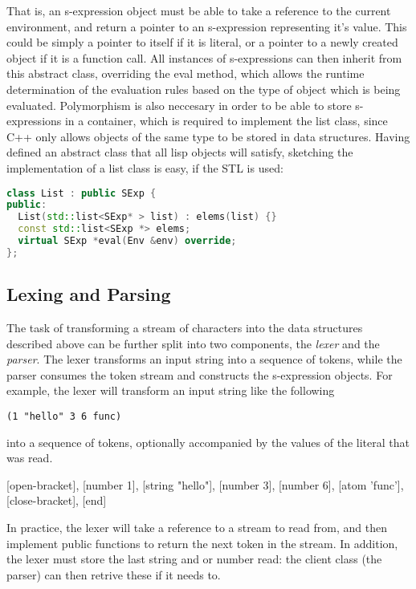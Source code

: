 \documentclass[12pt]{article}
\begin{document}
That is, an s-expression object must be able to take a reference to the current environment, and return a pointer to an s-expression representing it's value. This could be 
simply a pointer to itself if it is literal, or a pointer to a newly created object if it is a function call. All instances of s-expressions can then inherit from this abstract class, 
overriding the eval method, which allows the runtime determination of the evaluation rules based on the type of object which is being evaluated. Polymorphism is also 
neccesary in order to be able to store s-expressions in a container, which is required to implement the list class, since C++ only allows objects of the same type to be stored in data structures. Having defined an abstract class that all lisp objects will satisfy, sketching the implementation of a list class is easy, if the STL is used:
\begin{lstlisting}[language=C++]
class List : public SExp {
public:
  List(std::list<SExp* > list) : elems(list) {}
  const std::list<SExp *> elems;
  virtual SExp *eval(Env &env) override;
};
\end{lstlisting}


\subsection{Lexing and Parsing}
\label{section:parser}

The task of transforming a stream of characters into the data structures described above can be further split into two components, the \textit{lexer} and the \textit{parser}.
The lexer transforms an input string into a sequence of tokens, while the parser consumes the token stream and constructs the s-expression objects. For example, the 
lexer will transform an input string like the following
\begin{lstlisting}
(1 "hello" 3 6 func) 
\end{lstlisting}
into a sequence of tokens, optionally accompanied by the values of the literal that was read. 

[open-bracket], [number 1], [string "hello"], [number 3], [number 6], [atom 'func'], [close-bracket], [end]

In practice, the lexer will take a reference to a stream to read from, and then implement public functions to return the next token in the stream. In addition, the lexer 
must store the last string and or number read: the client class (the parser) can then retrive these if it needs to. 
\end{document}
